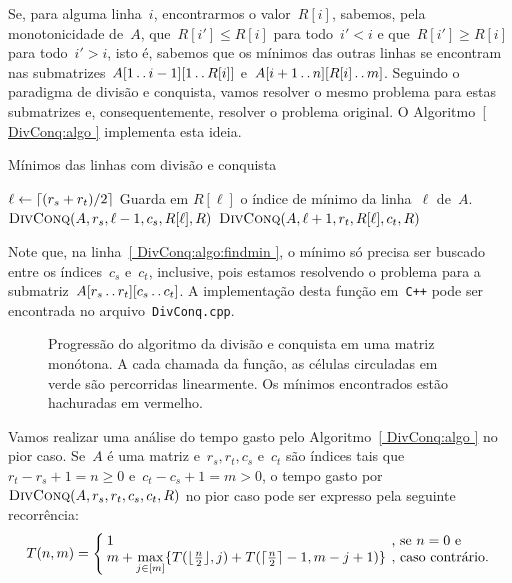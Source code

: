 Se, para alguma linha~$i$, encontrarmos o valor~$R[i]$, sabemos, pela monotonicidade de~$A$, que~${ R[i'] \leq R[i] }$ para todo~${ i' < i }$ e que~${ R[i'] \geq R[i] }$ para todo~${ i' > i }$, isto é, sabemos que os mínimos das outras linhas se encontram nas submatrizes~${ A[1 \,.\,.\, i-1][1 \,.\,.\, R[i]] }$ e~${ A[i+1 \,.\,.\, n][R[i] \,.\,.\, m] }$. Seguindo o paradigma de divisão e conquista, vamos resolver o mesmo problema para estas submatrizes e, consequentemente, resolver o problema original. O Algoritmo~\ref{ DivConq:algo } implementa esta ideia.

\newcommand{\DivConq}{\textsc{DivConq}}
\begin{algorithm}[h]
\caption{Mínimos das linhas com divisão e conquista}
\label{ DivConq:algo }
\begin{algorithmic}[1]
\Function{\DivConq}{A, r_s, r_t, c_s, c_t, R}
        \State $\ell \leftarrow \lceil (r_s + r_t)/2 \rceil$
        \State Guarda em $R[\ell]$ o índice de mínimo da linha~$\ell$ de~$A$. \label{ DivConq:algo:findmin }
        \State $\DivConq(A,r_s,\ell-1,c_s,R[\ell],R)$
        \State $\DivConq(A,\ell+1,r_t,R[\ell],c_t,R)$
    \EndIf
\EndFunction
\end{algorithmic}
\end{algorithm}

Note que, na linha~\ref{ DivConq:algo:findmin }, o mínimo só precisa ser buscado entre os índices~$c_s$ e~$c_t$, inclusive, pois estamos resolvendo o problema para a submatriz~$A[r_s \,.\,.\, r_t][c_s \,.\,.\, c_t]$. A implementação desta função em~\texttt{C++} pode ser encontrada no arquivo~\texttt{DivConq.cpp}.

\begin{figure}[h]
    \centering
    
    \caption{Progressão do algoritmo da divisão e conquista em uma matriz monótona. A cada chamada da função, as células circuladas em verde são percorridas linearmente. Os mínimos encontrados estão hachuradas em vermelho.} \label{ DivConq:Figure }
\end{figure}

Vamos realizar uma análise do tempo gasto pelo Algoritmo~\ref{ DivConq:algo } no pior caso. Se~$A$ é uma matriz e~${ r_s,r_t,c_s }$ e~$c_t$ são índices tais que~${ r_t - r_s + 1 = n \geq 0 }$ e~${ c_t - c_s + 1 = m > 0 }$, o tempo gasto por~$\DivConq(A,r_s,r_t,c_s,c_t,R)$ no pior caso pode ser expresso pela seguinte recorrência:
\begin{equation*}
\arraycolsep=2pt
T(n,m) = \left\{
\begin{array}{ll}
    1 &  \text{, se } n = 0 \text{ e } \\
    m + \max\limits_{j \in [m]}\{ T(\floor{ \frac{n}{2} },j) + T(\ceil{ \frac{n}{2} } - 1, m - j + 1) \} & \text{, caso contrário.} \\
\end{array}
\right.
\end{equation*}

